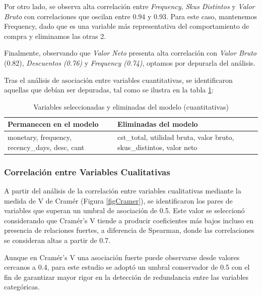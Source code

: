 Por otro lado, se observa alta correlación entre \textit{Frequency}, \textit{Skus Distintos} y \textit{Valor Bruto} con correlaciones que oscilan entre 0.94 y 0.93. Para este caso, mantenemos Frequency, dado que es una variable más representativa del comportamiento de compra y eliminamos las otras 2.

Finalmente, observando que \textit{Valor Neto} presenta alta correlación con \textit{Valor Bruto} (0.82), \textit{Descuentos (0.76)} y \textit{Frequency (0.74)}, optamos por depurarla del análisis.


Tras el análisis de asociación entre variables cuantitativas, se identificaron aquellas que debían ser depuradas, tal como se ilustra en la tabla \ref{fidepuración}:
\begin{table}[H]
\centering
\caption{\label{fidepuración}Variables seleccionadas y eliminadas del modelo (cuantitativas)}
\begin{tabular}{p{7cm} p{7cm}}
\hline
\textbf{Permanecen en el modelo} & \textbf{Eliminadas del modelo} \\
\hline
monetary, frequency, recency\_days, desc, cant  & 
cst\_total, utilidad bruta, valor bruto, skus\_distintos, valor neto \\
\hline
\end{tabular}
\end{table}

\subsubsection{Correlación entre Variables Cualitativas}
A partir del análisis de la correlación entre variables cualitativas mediante la medida de V de Cramér (Figura \ref{figCramer}), se identificaron los pares de variables que superan un umbral de asociación de 0.5. Este valor se seleccionó considerando que Cramér’s V tiende a producir coeficientes más bajos incluso en presencia de relaciones fuertes, a diferencia de Spearman, donde las correlaciones se consideran altas a partir de 0.7. 

Aunque en Cramér’s V una asociación fuerte puede observarse desde valores cercanos a 0.4, para este estudio se adoptó un umbral conservador de 0.5 con el fin de garantizar mayor rigor en la detección de redundancia entre las variables categóricas.

